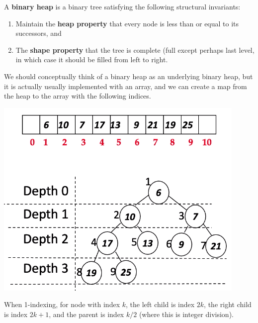   \begin{definition}
  A \textbf{binary heap} is a binary tree satisfying the following structural invariants: 
  \begin{enumerate}
      \item Maintain the \textbf{heap property} that every node is less than or equal to its successors, and 
      \item The \textbf{shape property} that the tree is complete (full except perhaps last level, in which case it should be filled from left to right. 
  \end{enumerate}
  We should conceptually think of a binary heap as an underlying binary heap, but it is actually usually implemented with an array, and we can create a map from the heap to the array with the following indices. 
  \begin{center}
      \includegraphics[scale=0.5]{img/binary_heap.png}
  \end{center}
  When 1-indexing, for node with index $k$, the left child is index $2k$, the right child is index $2k + 1$, and the parent is index $k/2$ (where this is integer division). 
  \end{definition}

